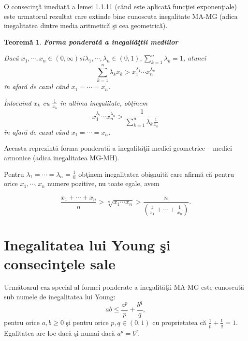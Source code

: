 \documentclass[a4paper,12pt,oneside]{report}
\newtheorem{theorem}{Teorem\u a}
\begin{document}
O consecin\c{t}\u{a} imediat\u{a} a lemei 1.1.11 (c\^{a}nd este aplicat\u{a} func\c{t}iei exponen\c{t}iale) este urmatorul rezultat care extinde bine cunoscuta inegalitate MA-MG (adica inegalitatea dintre media aritmetic\u{a} \c{s}i cea geometric\u{a}).


\begin{theorem}
\textbf{Forma ponderat\u{a} a inegali\u{a}\c{t}tii mediilor}

Dac\u{a} \(x_{1},\cdots,x_{n}\in \left ( 0,\infty  \right ) si \lambda_{1},\cdots,\lambda _{n} \in \left ( 0 , 1 \right ), \sum_{k = 1}^{n}\lambda _{k}= 1\), atunci
\begin{displaymath}
  \sum_{k = 1}^{n}\lambda _{k}x_{k}> x_{1}^{\lambda _{1}}\cdots x_{n}^{\lambda _{n}}
\end{displaymath}
\^{i}n afar\u{a} de cazul c\^{a}nd \(x_{1} = \cdots = x_{n}\).
	
	\^{I}nlocuind \(x_{k}\) cu \(\frac{1}{x_{k} }\) \^{i}n ultima inegalitate, ob\c{t}inem
\begin{displaymath}
  x_{1}^{\lambda _{1}}\cdots x_{n}^{\lambda _{n}}> \frac{1}{\sum_{k = 1}^{n}\lambda _{k}\frac{1}{x_{k}}}
\end{displaymath}
\^{i}n afar\u{a} de cazul c\^{a}nd \(x_{1} = \cdots = x_{n}\).
\end{theorem}
Aceasta reprezint\u{a} forma ponderat\u{a} a inegalit\u{a}\c{t}ii mediei geometrice – mediei armonice (adica inegalitatea MG-MH).

Pentru \(\lambda _{1} = \cdots =\lambda _{n}= \frac{1}{n}\) ob\c{t}inem inegalitatea obi\c{s}nuit\u{a} care afirm\u{a} c\u{a} pentru orice \(x_{1},\cdots,x_{n}\)  numere pozitive, nu toate egale, avem

\begin{displaymath}
  \frac{x_{1}+\cdots+x_{n}}{n}> \sqrt[n]{x_{1}\cdots x_{n}}> \frac{n}{\left ( \frac{1}{x_{1}}+\cdots+\frac{1}{x_{n}} \right )}.
\end{displaymath}




\section{Inegalitatea lui Young \c{s}i consecin\c{t}ele sale}

Urm\u{a}toarul caz special al formei ponderate a inegalit\u{a}\c{t}ii MA-MG este cunoscut\u{a} sub numele de inegalitatea lui Young:
\begin{displaymath}
  ab \leq \frac{a^{p}}{p}+ \frac{b^{q}}{q},
\end{displaymath}
pentru orice \(a,b \geq 0\)
\c{s}i pentru orice  \(p,q \in \left ( 0 , 1 \right )\) cu proprietatea c\u{a} \(\frac{1}{p}+\frac{1}{q} = 1\).
Egalitatea are loc dac\u{a} \c{s}i numai dac\u{a} \(a^{p}= b^{q}\).
\end{document}
